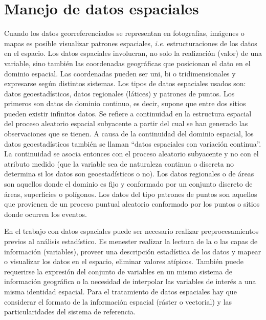 \documentclass[11pt,b5paper,]{krantz}
\begin{document}
\chapter{Manejo de datos espaciales}\label{manejo-de-datos-espaciales}

Cuando los datos georreferenciados se representan en fotografías,
imágenes o mapas es posible visualizar patrones espaciales, \emph{i.e.}
estructuraciones de los datos en el espacio. Los datos espaciales
involucran, no solo la realización (valor) de una variable, sino también
las coordenadas geográficas que posicionan el dato en el dominio
espacial. Las coordenadas pueden ser uni, bi o tridimensionales y
expresarse según distintos sistemas. Los tipos de datos espaciales
usados son: datos geoestadísticos, datos regionales (látices) y patrones
de puntos. Los primeros son datos de dominio continuo, es decir, supone
que entre dos sitios pueden existir infinitos datos. Se refiere a
continuidad en la estructura espacial del proceso aleatorio espacial
subyacente a partir del cual se han generado las observaciones que se
tienen. A causa de la continuidad del dominio espacial, los datos
geoestadísticos también se llaman ``datos espaciales con variación
continua''. La continuidad se asocia entonces con el proceso aleatorio
subyacente y no con el atributo medido (que la variable sea de
naturaleza continua o discreta no determina si los datos son
geoestadísticos o no). Los datos regionales o de áreas son aquellos
donde el dominio es fijo y conformado por un conjunto discreto de áreas,
superficies o polígonos. Los datos del tipo patrones de puntos son
aquellos que provienen de un proceso puntual aleatorio conformado por
los puntos o sitios donde ocurren los eventos.

En el trabajo con datos espaciales puede ser necesario realizar
preprocesamientos previos al análisis estadístico. Es menester realizar
la lectura de la o las capas de información (variables), proveer una
descripción estadística de los datos y mapear o visualizar los datos en
el espacio, eliminar valores atípicos. También puede requerirse la
expresión del conjunto de variables en un mismo sistema de información
geográfica o la necesidad de interpolar las variables de interés a una
misma identidad espacial. Para el tratamiento de datos espaciales hay
que considerar el formato de la información espacial (ráster o
vectorial) y las particularidades del sistema de referencia.
\end{document}

